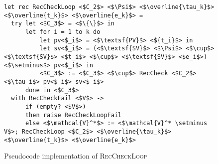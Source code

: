 \begin{figure}
\centering

\begin{verbatim}
let rec RecCheckLoop <$C_2$> <$\Psi$> <$\overline{\tau_k}$> <$\overline{t_k}$> <$\overline{e_k}$> =
  try let <$C_3$> = <$\{\}$> in
      let for i = 1 to k do
          let pv<$_i$> = <$\textsf{PV}$> <${t_i}$> in
          let sv<$_i$> = (<$\textsf{SV}$> <$\Psi$> <$\cup$> <$\textsf{SV}$> <$t_i$> <$\cup$> <$\textsf{SV}$> <$e_i$>) <$\setminus$> pv<$_i$> in
          <$C_3$> := <$C_3$> <$\cup$> RecCheck <$C_2$> <$\tau_i$> pv<$_i$> sv<$_i$>
      done in <$C_3$>
  with RecCheckFail <$V$> ->
      if (empty? <$V$>)
      then raise RecCheckLoopFail
      else <$\mathcal{V}^*$> := <$\mathcal{V}^* \setminus V$>; RecCheckLoop <$C_2$> <$\overline{\tau_k}$> <$\overline{t_k}$> <$\overline{e_k}$>
\end{verbatim}

\caption{Pseudocode implementation of \textsc{RecCheckLoop}}
\label{fig:helpers}
\end{figure}
